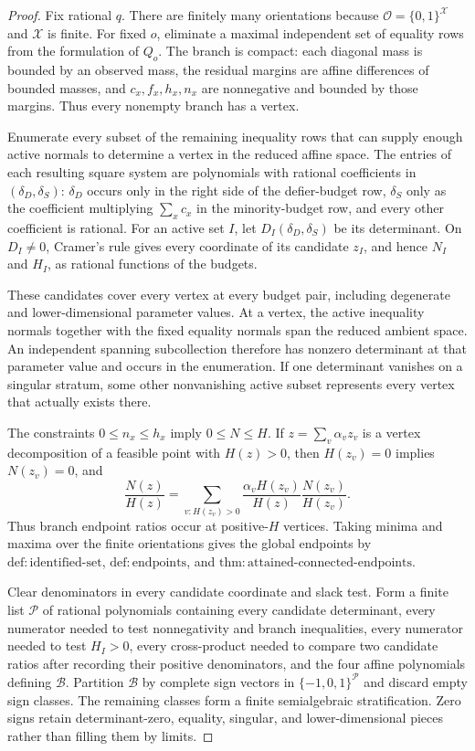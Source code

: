 \documentclass{article}
\begin{document}
\begin{proof}
Fix rational \(q\). There are finitely many orientations because \(\mathcal O=\{0,1\}^{\mathcal X}\) and \(\mathcal X\) is finite. For fixed \(o\), eliminate a maximal independent set of equality rows from the formulation of \(Q_o\). The branch is compact: each diagonal mass is bounded by an observed mass, the residual margins are affine differences of bounded masses, and \(c_x,f_x,h_x,n_x\) are nonnegative and bounded by those margins. Thus every nonempty branch has a vertex.

Enumerate every subset of the remaining inequality rows that can supply enough active normals to determine a vertex in the reduced affine space. The entries of each resulting square system are polynomials with rational coefficients in \((\delta_D,\delta_S)\): \(\delta_D\) occurs only in the right side of the defier-budget row, \(\delta_S\) only as the coefficient multiplying \(\sum_xc_x\) in the minority-budget row, and every other coefficient is rational. For an active set \(I\), let \(D_I(\delta_D,\delta_S)\) be its determinant. On \(D_I\neq0\), Cramer's rule gives every coordinate of its candidate \(z_I\), and hence \(N_I\) and \(H_I\), as rational functions of the budgets.

These candidates cover every vertex at every budget pair, including degenerate and lower-dimensional parameter values. At a vertex, the active inequality normals together with the fixed equality normals span the reduced ambient space. An independent spanning subcollection therefore has nonzero determinant at that parameter value and occurs in the enumeration. If one determinant vanishes on a singular stratum, some other nonvanishing active subset represents every vertex that actually exists there.

The constraints \(0\leq n_x\leq h_x\) imply \(0\leq N\leq H\). If \(z=\sum_v\alpha_vz_v\) is a vertex decomposition of a feasible point with \(H(z)>0\), then \(H(z_v)=0\) implies \(N(z_v)=0\), and
\[
 \frac{N(z)}{H(z)}
 =\sum_{v:H(z_v)>0}
 \frac{\alpha_vH(z_v)}{H(z)}
 \frac{N(z_v)}{H(z_v)}.
\]
Thus branch endpoint ratios occur at positive-\(H\) vertices. Taking minima and maxima over the finite orientations gives the global endpoints by \(\mathrm{def:identified\text{-}set}\), \(\mathrm{def:endpoints}\), and \(\mathrm{thm:attained\text{-}connected\text{-}endpoints}\).

Clear denominators in every candidate coordinate and slack test. Form a finite list \(\mathscr P\) of rational polynomials containing every candidate determinant, every numerator needed to test nonnegativity and branch inequalities, every numerator needed to test \(H_I>0\), every cross-product needed to compare two candidate ratios after recording their positive denominators, and the four affine polynomials defining \(\mathcal B\). Partition \(\mathcal B\) by complete sign vectors in \(\{-1,0,1\}^{\mathscr P}\) and discard empty sign classes. The remaining classes form a finite semialgebraic stratification. Zero signs retain determinant-zero, equality, singular, and lower-dimensional pieces rather than filling them by limits.


\end{proof}
\end{document}
